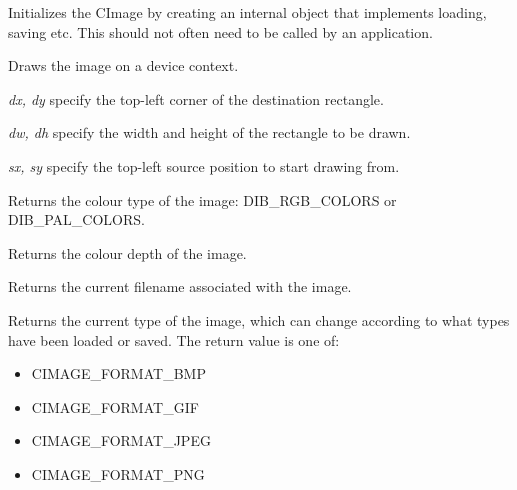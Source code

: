 \label{createimplementation}


Initializes the CImage by creating an internal object that implements loading, saving etc. This should
not often need to be called by an application.

\label{draw}


Draws the image on a device context.

{\it dx, dy} specify the top-left corner of the destination rectangle.

{\it dw, dh} specify the width and height of the rectangle to be drawn.

{\it sx, sy} specify the top-left source position to start drawing from.

\label{getcolortype}


Returns the colour type of the image: DIB\_RGB\_COLORS or DIB\_PAL\_COLORS.

\label{getdepth}


Returns the colour depth of the image.

\label{getfilename}


Returns the current filename associated with the image.

\label{getfiletype}


Returns the current type of the image, which can change according to what types
have been loaded or saved. The return value is one of:

\begin{itemize}\itemsep=0pt
\item CIMAGE\_FORMAT\_BMP
\item CIMAGE\_FORMAT\_GIF
\item CIMAGE\_FORMAT\_JPEG
\item CIMAGE\_FORMAT\_PNG
\end{itemize}

